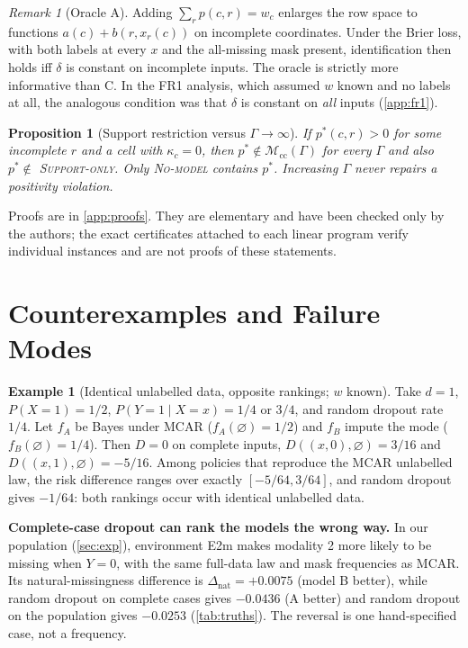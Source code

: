 \documentclass{article}
\theoremstyle{plain}
\newtheorem{proposition}[theorem]{Proposition}
\theoremstyle{definition}
\newtheorem{example}[theorem]{Example}
\theoremstyle{remark}
\newtheorem{remark}[theorem]{Remark}
\newcommand{\Dnat}{\Delta_{\mathrm{nat}}}
\newcommand{\Mcc}{\mathcal{M}_{\mathrm{cc}}}
\begin{document}
\begin{remark}[Oracle A]
Adding $\sum_r p(c,r)=w_c$ enlarges the row space to functions
$a(c)+b(r,x_r(c))$ on incomplete coordinates. Under the Brier loss, with both
labels at every $x$ and the all-missing mask present, identification then
holds iff $\delta$ is constant on incomplete inputs. The oracle is strictly
more informative than C. In the FR1 analysis, which assumed $w$ known and no
labels at all, the analogous condition was that $\delta$ is constant on
\emph{all} inputs (\cref{app:fr1}).
\end{remark}

\begin{proposition}[Support restriction versus $\Gamma\to\infty$]\label{prop:support}
If $p^*(c,r)>0$ for some incomplete $r$ and a cell with $\kappa_c=0$, then
$p^*\notin\Mcc(\Gamma)$ for every $\Gamma$ and also $p^*\notin$
\textsc{Support-only}. Only \textsc{No-model} contains $p^*$. Increasing
$\Gamma$ never repairs a positivity violation.
\end{proposition}

Proofs are in \cref{app:proofs}. They are elementary and have been checked
only by the authors; the exact certificates attached to each linear program
verify individual instances and are not proofs of these statements.

\section{Counterexamples and Failure Modes}
\label{sec:counter}

\begin{example}[Identical unlabelled data, opposite rankings; $w$ known]\label{ex:cx1}
Take $d=1$, $P(X=1)=1/2$, $P(Y=1\mid X=x)=1/4$ or $3/4$, and random dropout rate
$1/4$. Let $f_A$ be Bayes under MCAR ($f_A(\varnothing)=1/2$) and $f_B$ impute
the mode ($f_B(\varnothing)=1/4$). Then $D=0$ on complete inputs,
$D((x,0),\varnothing)=3/16$ and $D((x,1),\varnothing)=-5/16$. Among policies
that reproduce the MCAR unlabelled law, the risk difference ranges over
exactly $[-5/64,3/64]$, and random dropout gives $-1/64$: both rankings occur
with identical unlabelled data.
\end{example}

\textbf{Complete-case dropout can rank the models the wrong way.} In our
population (\cref{sec:exp}), environment E2m makes modality 2 more likely to
be missing when $Y=0$, with the same full-data law and mask frequencies as
MCAR. Its natural-missingness difference is $\Dnat=+0.0075$ (model B better),
while random dropout on complete cases gives $-0.0436$ (A better) and random
dropout on the population gives $-0.0253$ (\cref{tab:truths}). The reversal is
one hand-specified case, not a frequency.
\end{document}
